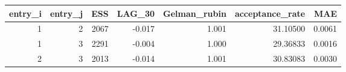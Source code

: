 \begin{longtable}{rrrrrrr}
\toprule
entry\_i & entry\_j & ESS & LAG\_30 & Gelman\_rubin & acceptance\_rate & MAE \\ 
\midrule
1 & 2 & 2067 & -0.017 & 1.001 & 31.10500 & 0.0061 \\ 
1 & 3 & 2291 & -0.004 & 1.000 & 29.36833 & 0.0016 \\ 
2 & 3 & 2013 & -0.014 & 1.001 & 30.83083 & 0.0030 \\ 
\bottomrule
\end{longtable}

